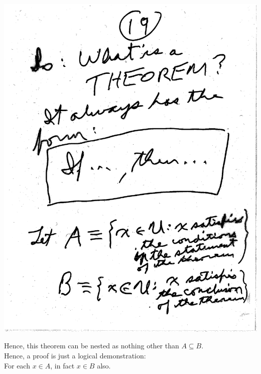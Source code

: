 \documentclass[10pt,a4paper]{article}
\begin{document}
{{\includegraphics[scale=.5]{Pages/ST_19}

\newpage

\noindent Hence, this theorem can be nested as nothing other than $A \subseteq B $.
\\ \indent Hence, a proof is just a logical demonstration:
\\ \indent For each $x \in A$, in fact $x \in B$ also.

}}
\end{document}
